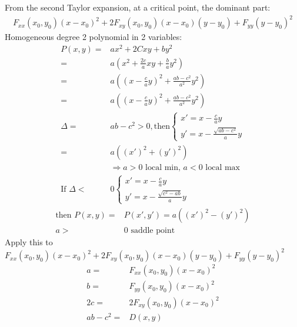 \documentclass{article}
\begin{document}
        From the second Taylor expansion, at a critical point, the dominant part:
        \begin{align}
            F_{xx}(x_0,y_0)(x-x_0)^2 + 2F_{xy}(x_0,y_0)(x-x_0)(y-y_0)+F_{yy}(y-y_0)^2
        \end{align}
        Homogeneous degree 2 polynomial in 2 variables:
        \begin{align}
            P(x,y) =& ax^2 + 2Cxy + by^2\\
            =&a(x^2 + \frac{2c}{a}xy + \frac{b}{a}y^2)\\
            =&a((x-\frac{c}{a}y)^2 + \frac{ab-c^2}{a^2}y^2)\\
            =&a((x-\frac{c}{a}y)^2 + \frac{ab-c^2}{a^2}y^2)\\
            \Delta =& ab-c^2 > 0, \text{then}\begin{cases}
                x'=x-\frac{c}{a}y\\
                y'=x-\frac{\sqrt{ab-c^2}}{a}y
            \end{cases}\\
            =& a((x')^2 + (y')^2)\\
            &\Rightarrow a > 0 \text{ local min, }a < 0 \text{ local max}\\
            \text{If }\Delta <& 0 \begin{cases}
                x'=x-\frac{c}{a}y\\
                y'=x-\frac{\sqrt{c^2-ab}}{a}y
            \end{cases}
        \end{align}
        \begin{align}
            \text{then } P(x,y) =& P(x', y') = a((x')^2-(y')^2)\\
            a>&0 \text{ saddle point}
        \end{align}
        Apply this to $F_{xx}(x_0,y_0)(x-x_0)^2 + 2F_{xy}(x_0,y_0)(x-x_0)(y-y_0)+F_{yy}(y-y_0)^2$
        \begin{align}
             a =& F_{xx}(x_0,y_0)(x-x_0)^2\\
             b =& F_{yy}(x_0,y_0)(x-x_0)^2\\ 
            2c =& 2F_{xy}(x_0,y_0)(x-x_0)^2\\
            ab-c^2 =& D(x,y)
        \end{align}
\end{document}
